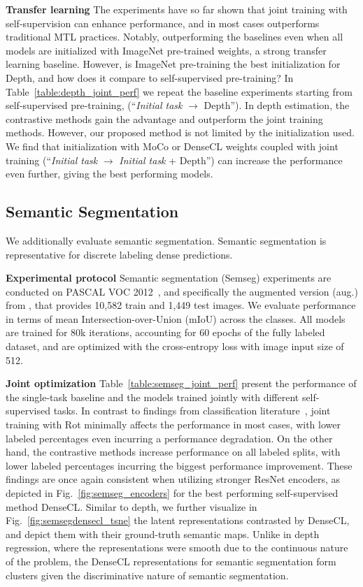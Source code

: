 \documentclass[10pt,twocolumn,letterpaper]{article}
\newcommand{\parsection}[1]{\vspace{1mm}\noindent\textbf{#1 }}
\begin{document}
\parsection{Transfer learning}
The experiments have so far shown that joint training with self-supervision can enhance performance, and in most cases outperforms traditional MTL practices.
Notably, outperforming the baselines even when all models are initialized with ImageNet pre-trained weights, a strong transfer learning baseline.
However, is ImageNet pre-training the best initialization for Depth, and how does it compare to self-supervised pre-training?
In Table~\ref{table:depth_joint_perf} we repeat the baseline experiments starting from self-supervised pre-training, (``\emph{Initial task} $\rightarrow$ Depth'').
In depth estimation, the contrastive methods gain the advantage and outperform the joint training methods.
However, our proposed method is not limited by the initialization used.
We find that initialization with MoCo or DenseCL weights coupled with joint training (``\emph{Initial task} $\rightarrow$ \emph{Initial task} + Depth'') can increase the performance even further, giving the best performing models.



\subsection{Semantic Segmentation}
\label{sec:semseg_exp}

We additionally evaluate semantic segmentation. 
Semantic segmentation is representative for discrete labeling dense predictions.

\parsection{Experimental protocol}
Semantic segmentation (Semseg) experiments are conducted on PASCAL VOC 2012~\cite{everingham2010pascal}, and specifically the augmented version (aug.) from \cite{hariharan2011semantic}, that provides 10,582 train and 1,449 test images. 
We evaluate performance in terms of mean Intersection-over-Union (mIoU) across the classes. 
All models are trained for 80k iterations, accounting for 60 epochs of the fully labeled dataset, and are optimized with the cross-entropy loss with image input size of 512. 

\parsection{Joint optimization}
Table~\ref{table:semseg_joint_perf} present the performance of the single-task baseline and the models trained jointly with different self-supervised tasks. 
In contrast to findings from classification literature~\cite{gidaris2019boosting,zhai2019s4l}, joint training with Rot minimally affects the performance in most cases, with lower labeled percentages even incurring a performance degradation. 
On the other hand, the contrastive methods increase performance on all labeled splits, with lower labeled percentages incurring the biggest performance improvement. 
These findings are once again consistent when utilizing stronger ResNet encoders, as depicted in Fig.~\ref{fig:semseg_encoders} for the best performing self-supervised method DenseCL.
Similar to depth, we further visualize in Fig.~\ref{fig:semsegdensecl_tsne} the latent representations contrasted by DenseCL, and depict them with their ground-truth semantic maps. 
Unlike in depth regression, where the representations were smooth due to the continuous nature of the problem, the DenseCL representations for semantic segmentation form clusters given the discriminative nature of semantic segmentation.
\end{document}
